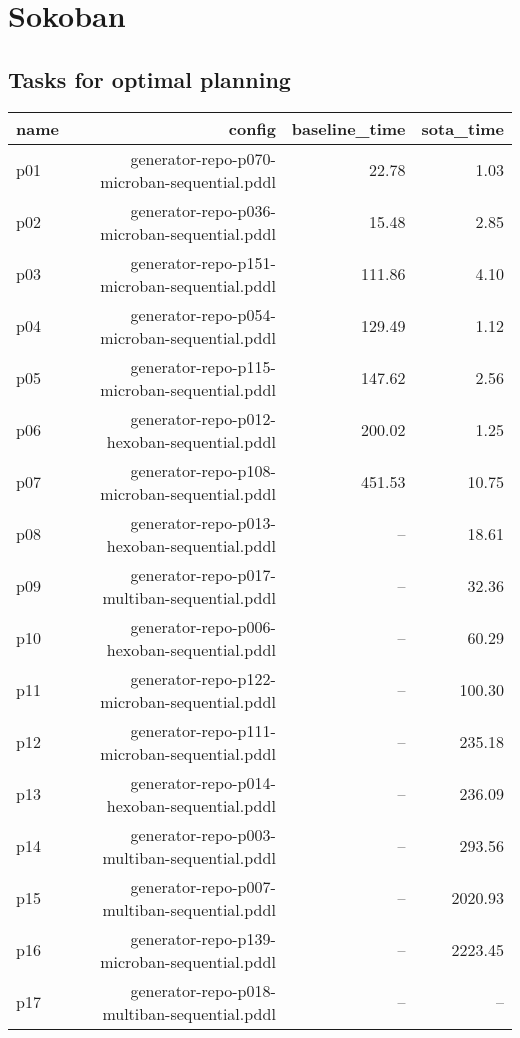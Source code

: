 \documentclass{article}
\begin{document}
                \newpage \section{Sokoban}
                    \subsection*{Tasks for optimal planning}
                    
                            \begin{center}
                            \scriptsize
                            \begin{tabular}{@{}l|r|r|r@{}}
                            name & config & baseline\_time & sota\_time\\\midrule
                              p01& generator-repo-p070-microban-sequential.pddl&22.78&1.03\\
  p02& generator-repo-p036-microban-sequential.pddl&15.48&2.85\\
  p03& generator-repo-p151-microban-sequential.pddl&111.86&4.10\\
  p04& generator-repo-p054-microban-sequential.pddl&129.49&1.12\\
  p05& generator-repo-p115-microban-sequential.pddl&147.62&2.56\\
  p06& generator-repo-p012-hexoban-sequential.pddl&200.02&1.25\\
  p07& generator-repo-p108-microban-sequential.pddl&451.53&10.75\\
  p08& generator-repo-p013-hexoban-sequential.pddl&--&18.61\\
  p09& generator-repo-p017-multiban-sequential.pddl&--&32.36\\
  p10& generator-repo-p006-hexoban-sequential.pddl&--&60.29\\
  p11& generator-repo-p122-microban-sequential.pddl&--&100.30\\
  p12& generator-repo-p111-microban-sequential.pddl&--&235.18\\
  p13& generator-repo-p014-hexoban-sequential.pddl&--&236.09\\
  p14& generator-repo-p003-multiban-sequential.pddl&--&293.56\\
  p15& generator-repo-p007-multiban-sequential.pddl&--&2020.93\\
  p16& generator-repo-p139-microban-sequential.pddl&--&2223.45\\
  p17& generator-repo-p018-multiban-sequential.pddl&--&--\\

\end{tabular}
\end{center}
\end{document}
